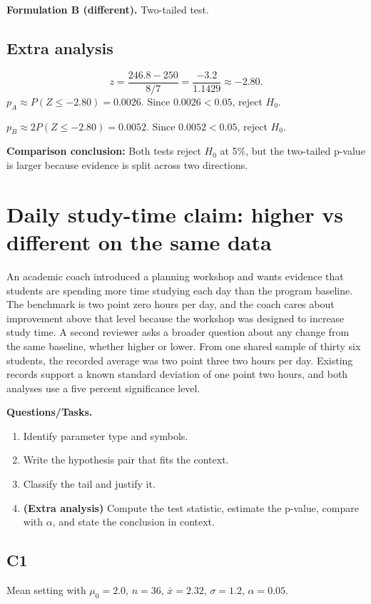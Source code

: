 \textbf{Formulation B (different).} Two-tailed test. \TwoTailGraph

\subsection*{Extra analysis}
\[
z=\frac{246.8-250}{8/7}=\frac{-3.2}{1.1429}\approx -2.80.
\]
\(p_A\approx P(Z\le -2.80)=0.0026\).
Since \(0.0026<0.05\), reject \(H_0\).

\(p_B\approx 2P(Z\le -2.80)=0.0052\).
Since \(0.0052<0.05\), reject \(H_0\).

\textbf{Comparison conclusion:} Both tests reject \(H_0\) at 5\%, but the two-tailed p-value is larger because evidence is split across two directions.


\section{Daily study-time claim: higher vs different on the same data}
An academic coach introduced a planning workshop and wants evidence that students are spending more time studying each day than the program baseline. The benchmark is two point zero hours per day, and the coach cares about improvement above that level because the workshop was designed to increase study time. A second reviewer asks a broader question about any change from the same baseline, whether higher or lower. From one shared sample of thirty six students, the recorded average was two point three two hours per day. Existing records support a known standard deviation of one point two hours, and both analyses use a five percent significance level.

\textbf{Questions/Tasks.}
\begin{enumerate}
    \item[(C1)] Identify parameter type and symbols.
    \item[(C2)] Write the hypothesis pair that fits the context.
    \item[(C3)] Classify the tail and justify it.
    \item[(EA)] \textbf{(Extra analysis)} Compute the test statistic, estimate the p-value, compare with \(\alpha\), and state the conclusion in context.
\end{enumerate}

\subsection*{C1}
Mean setting with \(\mu_0=2.0\), \(n=36\), \(\bar{x}=2.32\), \(\sigma=1.2\), \(\alpha=0.05\).

